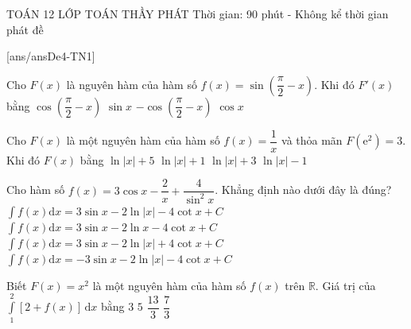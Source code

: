 \begin{name}
	{\tenchude}
	{TOÁN 12}
	{LỚP TOÁN THẦY PHÁT}
	{Thời gian: 90 phút - Không kể thời gian phát đề}
\end{name}
[ans/ansDe4-TN1]
\begin{ex}%
	Cho $F(x)$ là nguyên hàm của hàm số $f(x)=\sin \left(\dfrac{\pi}{2}-x\right)$. Khi đó $F'(x)$ bằng
	\choice
	{$\cos \left(\dfrac{\pi}{2}-x\right)$}
	{$\sin x$}
	{$-\cos \left(\dfrac{\pi}{2}-x\right)$}
	{\True $\cos x$}
\end{ex}

\begin{ex}%
	Cho $F(x)$ là một nguyên hàm của hàm số $f(x)=\dfrac{1}{x}$ và thỏa mãn $F\left(\mathrm{e}^2\right)=3$. Khi đó $F(x)$ bằng
	\choice
	{$\ln |x|+5$}
	{\True $\ln |x|+1$}
	{$\ln |x|+3$}
	{$\ln |x|-1$}
\end{ex}

\begin{ex}%
	Cho hàm số $f(x)=3\cos x-\dfrac{2}{x}+\dfrac{4}{{{\sin }^2}x}$. Khẳng định nào dưới đây là đúng?
	\choice
	{\True $\displaystyle\int{f(x)\mathrm{d}x}=3\sin x-2\ln |x|-4\cot x+C$}
	{ $\displaystyle\int{f(x)\mathrm{d}x}=3\sin x-2\ln x-4\cot x+C$}
	{ $\displaystyle\int{f(x)\mathrm{d}x}=3\sin x-2\ln |x|+4\cot x+C$}
	{ $\displaystyle\int{f(x)\mathrm{d}x}=-3\sin x-2\ln |x|-4\cot x+C$}
\end{ex}

\begin{ex}%
	Biết $F(x)=x^2$ là một nguyên hàm của hàm số $f(x)$ trên $\mathbb{R}$. Giá trị của $\displaystyle  \int\limits_1^2\left[2+f(x)\right]\mathrm{\,d}x$ bằng
	\choice
	{$3$}
	{\True $5$}
	{$\dfrac{13}{3}$}
	{$\dfrac{7}{3}$}
\end{ex}

